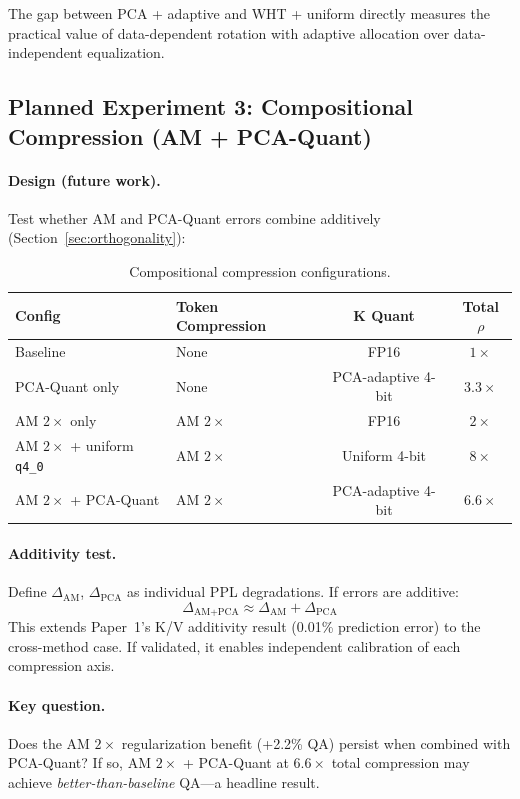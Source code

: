 The gap between PCA + adaptive and WHT + uniform directly measures the practical value of data-dependent rotation with adaptive allocation over data-independent equalization.

\subsection{Planned Experiment 3: Compositional Compression (AM + PCA-Quant)}

\paragraph{Design (future work).}
Test whether AM and PCA-Quant errors combine additively (Section~\ref{sec:orthogonality}):

\begin{table}[h]
\centering
\begin{tabular}{llcc}
\toprule
\textbf{Config} & \textbf{Token Compression} & \textbf{K Quant} & \textbf{Total $\rho$} \\
\midrule
Baseline & None & FP16 & $1\times$ \\
PCA-Quant only & None & PCA-adaptive 4-bit & $3.3\times$ \\
AM $2\times$ only & AM $2\times$ & FP16 & $2\times$ \\
AM $2\times$ + uniform \texttt{q4\_0} & AM $2\times$ & Uniform 4-bit & $8\times$ \\
AM $2\times$ + PCA-Quant & AM $2\times$ & PCA-adaptive 4-bit & $6.6\times$ \\
\bottomrule
\end{tabular}
\caption{Compositional compression configurations.}
\label{tab:exp3-configs}
\end{table}

\paragraph{Additivity test.}
Define $\Delta_{\text{AM}}$, $\Delta_{\text{PCA}}$ as individual PPL degradations. If errors are additive:
\begin{equation}
    \Delta_{\text{AM+PCA}} \approx \Delta_{\text{AM}} + \Delta_{\text{PCA}}
\end{equation}
This extends Paper~1's K/V additivity result (0.01\% prediction error) to the cross-method case. If validated, it enables independent calibration of each compression axis.

\paragraph{Key question.}
Does the AM $2\times$ regularization benefit (+2.2\% QA) persist when combined with PCA-Quant? If so, AM $2\times$ + PCA-Quant at $6.6\times$ total compression may achieve \emph{better-than-baseline} QA---a headline result.

